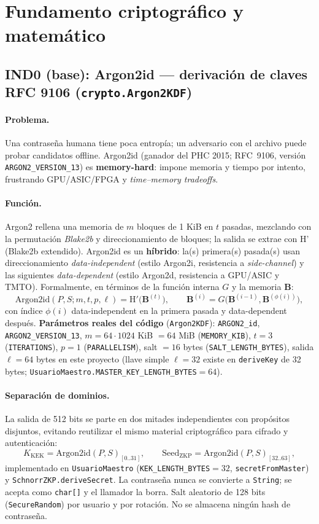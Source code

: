 \documentclass[11pt,a4paper]{article}
\begin{document}
\section{Fundamento criptográfico y matemático}\label{sec:crypto}

\subsection{IND0 (base): Argon2id --- derivación de claves RFC 9106 (\texttt{crypto.Argon2KDF})}
\paragraph{Problema.} Una contraseña humana tiene poca entropía; un adversario con
el archivo puede probar candidatos offline. Argon2id (ganador del PHC 2015;
RFC~9106, versión \texttt{ARGON2\_VERSION\_13}) es \textbf{memory-hard}:
impone memoria y tiempo por intento, frustrando GPU/ASIC/FPGA y \emph{time--memory
tradeoffs}.

\paragraph{Función.} Argon2 rellena una memoria de $m$ bloques de 1 KiB en $t$
pasadas, mezclando con la permutación \emph{Blake2b} y direccionamiento de bloques;
la salida se extrae con H' (Blake2b extendido). Argon2id es un \textbf{híbrido}:
la(s) primera(s) pasada(s) usan direccionamiento \emph{data-independent} (estilo
Argon2i, resistencia a \emph{side-channel}) y las siguientes \emph{data-dependent}
(estilo Argon2d, resistencia a GPU/ASIC y TMTO). Formalmente, en términos de la
función interna $G$ y la memoria $\mathbf{B}$:
\[
  \text{Argon2id}(P, S; m, t, p, \ell) = \text{H}'\big(\mathbf{B}^{(t)}\big),\qquad
  \mathbf{B}^{(i)} = G\big(\mathbf{B}^{(i-1)}, \mathbf{B}^{(\phi(i))}\big),
\]
con índice $\phi(i)$ data-independent en la primera pasada y data-dependent
después. \textbf{Parámetros reales del código} (\texttt{Argon2KDF}):
\texttt{ARGON2\_id}, \texttt{ARGON2\_VERSION\_13}, $m = 64 \cdot 1024$ KiB $= 64$
MiB (\texttt{MEMORY\_KIB}), $t = 3$ (\texttt{ITERATIONS}), $p = 1$
(\texttt{PARALLELISM}), salt $= 16$ bytes (\texttt{SALT\_LENGTH\_BYTES}), salida
$\ell = 64$ bytes en este proyecto (llave simple $\ell=32$ existe en
\texttt{deriveKey} de 32 bytes; \texttt{UsuarioMaestro.MASTER\_KEY\_LENGTH\_BYTES}$=64$).

\paragraph{Separación de dominios.} La salida de 512 bits se parte en dos mitades
independientes con propósitos disjuntos, evitando reutilizar el mismo material
criptográfico para cifrado y autenticación:
\[
  K_{\text{KEK}} = \text{Argon2id}(P,S)_{[0..31]},\qquad
  \text{Seed}_{\text{ZKP}} = \text{Argon2id}(P,S)_{[32..63]},
\]
implementado en \texttt{UsuarioMaestro} (\texttt{KEK\_LENGTH\_BYTES}$=32$,
\texttt{secretFromMaster}) y \texttt{SchnorrZKP.deriveSecret}. La contraseña
nunca se convierte a \texttt{String}; se acepta como \texttt{char[]} y el llamador
la borra. Salt aleatorio de 128 bits (\texttt{SecureRandom}) por usuario y por
rotación. No se almacena ningún hash de contraseña.
\end{document}
